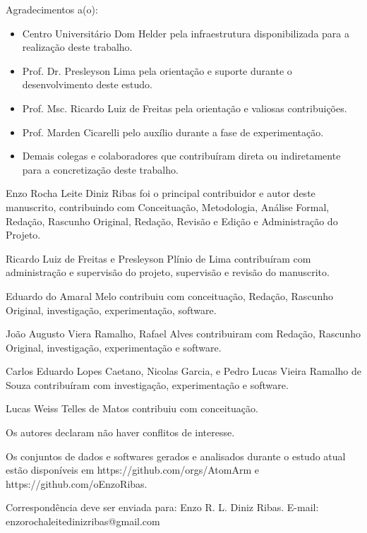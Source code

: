 \documentclass[portuguese]{sbc2025}%
\begin{document}
\begin{declarations}

\begin{acknowledgements}
Agradecimentos a(o):
\begin{itemize}
  \item Centro Universitário Dom Helder pela infraestrutura disponibilizada para a realização deste trabalho.
  \item Prof. Dr. Presleyson Lima pela orientação e suporte durante o desenvolvimento deste estudo.
  \item Prof. Msc. Ricardo Luiz de Freitas pela orientação e valiosas contribuições.
  \item Prof. Marden Cicarelli pelo auxílio durante a fase de experimentação.
  \item Demais colegas e colaboradores que contribuíram direta ou indiretamente para a concretização deste trabalho.
\end{itemize}
\end{acknowledgements}

\begin{contributions}
Enzo Rocha Leite Diniz Ribas foi o principal contribuidor e autor deste manuscrito, contribuindo com Conceituação, Metodologia, Análise Formal, Redação, Rascunho Original, Redação, Revisão e Edição e Administração do Projeto.

Ricardo Luiz de Freitas e Presleyson Plínio de Lima contribuíram com administração e supervisão do projeto, supervisão e revisão do manuscrito.

Eduardo do Amaral Melo contribuiu com conceituação, Redação, Rascunho Original, investigação, experimentação, software.

João Augusto Viera Ramalho, Rafael Alves contribuiram com Redação, Rascunho Original, investigação, experimentação e software.

Carlos Eduardo Lopes Caetano, Nicolas Garcia, e Pedro Lucas Vieira Ramalho de Souza contribuíram com investigação, experimentação e software.

Lucas Weiss Telles de Matos contribuiu com conceituação.

\end{contributions}

\begin{interests}
  Os autores declaram não haver conflitos de interesse.
\end{interests}

\begin{materials}
  Os conjuntos de dados e softwares gerados e analisados durante o estudo atual estão disponíveis em https://github.com/orgs/AtomArm e https://github.com/oEnzoRibas.
\end{materials}

\begin{furtherinformation}
  
  Correspondência deve ser enviada para: Enzo R. L. Diniz Ribas. E-mail: enzorochaleitedinizribas@gmail.com

\end{furtherinformation}
\end{declarations}



\end{document}

